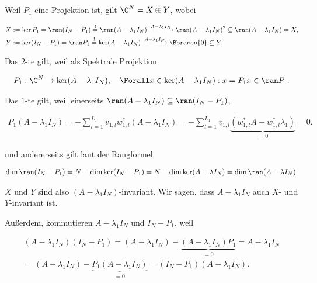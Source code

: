 \begin{remark} \label{rem:spektrale_projektion_linear}

    Weil $P_1$ eine Projektion ist, gilt $\C^N = X \oplus Y$, wobei

    \begin{align*}
        X & := \ker P_1 = \ran (I_N - P_1) \stackrel{!}{=} \ran (A - \lambda_1 I_N) \xrightarrow{A - \lambda_1 I_N} \ran (A - \lambda_1 I_N)^2 \subseteq \ran (A - \lambda_1 I_N) = X, \\
        Y & := \ker (I_N - P_1) = \ran P_1 \stackrel{!}{=} \ker (A - \lambda_1 I_N) \xrightarrow{A - \lambda_1 I_N} \Bbraces{0} \subseteq Y.
    \end{align*}

    Das $2$-te \Quote{!} gilt, weil als Spektrale Projektion

    \begin{align*}
        P_1: \C^N \to \ker (A - \lambda_1 I_N),
        \quad
        \Forall x \in \ker (A - \lambda_1 I_N):
            x = P_1 x \in \ran P_1.
    \end{align*}

    Das $1$-te \Quote{!} gilt, weil einerseits $\ran (A - \lambda_1 I_N) \subseteq \ran (I_N - P_1)$,

    \begin{align*}
        P_1 (A - \lambda_1 I_N)
        =
        -\sum_{l=1}^{L_1}
            v_{1, l} w_{1, l}^\ast
        (A - \lambda_1 I_N)
        =
        -\sum_{l=1}^{L_1}
            v_{1, l}
            \underbrace
            {
                (w_{1, l}^\ast A
                -
                w_{1, l}^\ast \lambda_1)
            }_{=0}
        =
        0.
    \end{align*}

    und andererseits gilt laut der Rangformel

    \begin{align*}
        \dim \ran (I_N - P_1)
        =
        N - \dim \ker (I_N - P_1)
        =
        N - \dim \ker (A - \lambda I_N)
        =
        \dim \ran (A - \lambda I_N).
    \end{align*}

    $X$ und $Y$ sind also $(A - \lambda_1 I_N)$-invariant.
    Wir sagen, dass $A - \lambda_1 I_N$ auch $X$- und $Y$-invariant ist.

    Außerdem, kommutieren $A - \lambda_1 I_N$ und $I_N - P_1$, weil

    \begin{multline*}
        (A - \lambda_1 I_N) (I_N - P_1)
        =
        (A - \lambda_1 I_N) - \underbrace{(A - \lambda_1 I_N) P_1}_{=0}
        =
        A - \lambda_1 I_N \\
        =
        (A - \lambda_1 I_N) - \underbrace{P_1 (A - \lambda_1 I_N)}_{=0}
        =
        (I_N - P_1) (A - \lambda_1 I_N).
    \end{multline*}
    
\end{remark}
